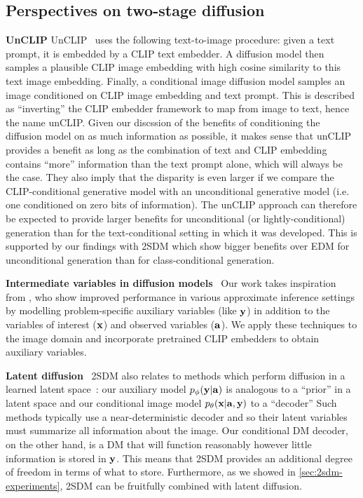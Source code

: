 \subsection{Perspectives on two-stage diffusion}
\textbf{UnCLIP} \label{sec:unclip}
UnCLIP~\citep{ramesh2022hierarchical} uses the following text-to-image procedure: given a text prompt, it is embedded by a CLIP text embedder. A diffusion model then samples a plausible CLIP image embedding with high cosine similarity to this text image embedding. Finally, a conditional image diffusion model samples an image conditioned on CLIP image embedding and text prompt. This is described as ``inverting'' the CLIP embedder framework to map from image to text, hence the name unCLIP. Given our discssion of the benefits of conditioning the diffusion model on as much information as possible, it makes sense that unCLIP provides a benefit as long as the combination of text and CLIP embedding contains ``more'' information than the text prompt alone, which will always be the case. They also imply that the disparity is even larger if we compare the CLIP-conditional generative model with an unconditional generative model  (i.e. one conditioned on zero bits of information). The unCLIP approach can therefore be expected to provide larger benefits for unconditional (or lightly-conditional) generation than for the text-conditional setting in which it was developed. This is supported by our findings with 2SDM which show bigger benefits over EDM for unconditional generation than for class-conditional generation.

\textbf{Intermediate variables in diffusion models}~
 Our work takes inspiration from \citet{weilbach2023graphically}, %
who show improved performance in various approximate inference settings by modelling problem-specific auxiliary variables (like ${\mathbf{y}}$) in addition to the variables of interest (${\mathbf{x}}$) and observed variables (${\mathbf{a}}$). We apply these techniques to the image domain and incorporate pretrained CLIP embedders to obtain auxiliary variables. 

\textbf{Latent diffusion}~
2SDM also relates to methods which perform diffusion in a learned latent space~\citep{rombach2022high}: our auxiliary model $p_\phi({\mathbf{y}}|{\mathbf{a}})$ is analogous to a ``prior'' in a latent space and our conditional image model $p_\theta({\mathbf{x}}|{\mathbf{a}},{\mathbf{y}})$ to a ``decoder'' Such methods typically use a near-deterministic decoder and so their latent variables must summarize all information about the image. Our conditional DM decoder, on the other hand, is a DM that will function reasonably however little information is stored in ${\mathbf{y}}$. This means that 2SDM provides an additional degree of freedom in terms of what to store. Furthermore, as we showed in \cref{sec:2sdm-experiments}, 2SDM can be fruitfully combined with latent diffusion.

